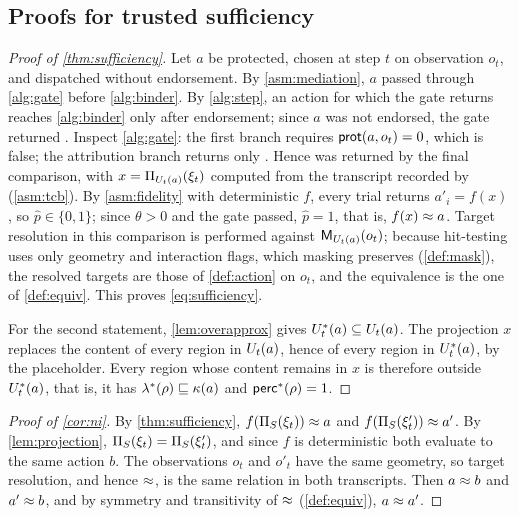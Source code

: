 \subsection{Proofs for trusted sufficiency}

\begin{proof}[Proof of \cref{thm:sufficiency}]
Let $a$ be protected, chosen at step $t$ on observation $o_t$, and dispatched without endorsement. By \cref{asm:mediation}, $a$ passed through \cref{alg:gate} before \cref{alg:binder}. By \cref{alg:step}, an action for which the gate returns \ESC{} reaches \cref{alg:binder} only after endorsement; since $a$ was not endorsed, the gate returned \PASS. Inspect \cref{alg:gate}: the first \PASS{} branch requires $\mathsf{prot}(a,o_t)=0$, which is false; the attribution branch returns only \ESC{}. Hence \PASS{} was returned by the final comparison, with $x=\Pi_{U_t(a)}(\xi_t)$ computed from the transcript recorded by \PG{} (\cref{asm:tcb}). By \cref{asm:fidelity} with deterministic $f$, every trial returns $a'_i=f(x)$, so $\hat p\in\{0,1\}$; since $\theta>0$ and the gate passed, $\hat p=1$, that is, $f(x)\approx a$. Target resolution in this comparison is performed against $\mathsf{M}_{U_t(a)}(o_t)$; because hit-testing uses only geometry and interaction flags, which masking preserves (\cref{def:mask}), the resolved targets are those of \cref{def:action} on $o_t$, and the equivalence is the one of \cref{def:equiv}. This proves \cref{eq:sufficiency}.

For the second statement, \cref{lem:overapprox} gives $U^*_t(a)\subseteq U_t(a)$. The projection $x$ replaces the content of every region in $U_t(a)$, hence of every region in $U^*_t(a)$, by the placeholder. Every region whose content remains in $x$ is therefore outside $U^*_t(a)$, that is, it has $\lambda^*(\rho)\sqsubseteq\kappa(a)$ and $\mathsf{perc}^*(\rho)=1$.
\end{proof}

\begin{proof}[Proof of \cref{cor:ni}]
By \cref{thm:sufficiency}, $f(\Pi_S(\xi_t))\approx a$ and $f(\Pi_S(\xi'_t))\approx a'$. By \cref{lem:projection}, $\Pi_S(\xi_t)=\Pi_S(\xi'_t)$, and since $f$ is deterministic both evaluate to the same action $b$. The observations $o_t$ and $o'_t$ have the same geometry, so target resolution, and hence $\approx$, is the same relation in both transcripts. Then $a\approx b$ and $a'\approx b$, and by symmetry and transitivity of $\approx$ (\cref{def:equiv}), $a\approx a'$.
\end{proof}

